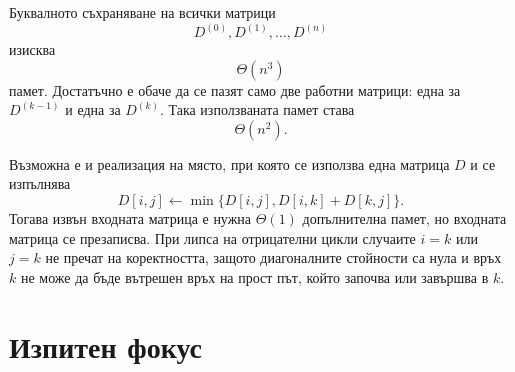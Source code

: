 Буквалното съхраняване на всички матрици
\[
D^{(0)},D^{(1)},\ldots,D^{(n)}
\]
изисква
\[
\Theta(n^3)
\]
памет. Достатъчно е обаче да се пазят само две работни матрици: една за $D^{(k-1)}$ и една за $D^{(k)}$. Така използваната памет става
\[
\Theta(n^2).
\]

Възможна е и реализация на място, при която се използва една матрица $D$ и се изпълнява
\[
D[i,j]\leftarrow
\min\{D[i,j],D[i,k]+D[k,j]\}.
\]
Тогава извън входната матрица е нужна $\Theta(1)$ допълнителна памет, но входната матрица се презаписва. При липса на отрицателни цикли случаите $i=k$ или $j=k$ не пречат на коректността, защото диагоналните стойности са нула и връх $k$ не може да бъде вътрешен връх на прост път, който започва или завършва в $k$.

\section{Изпитен фокус}\label{s:8.7}

